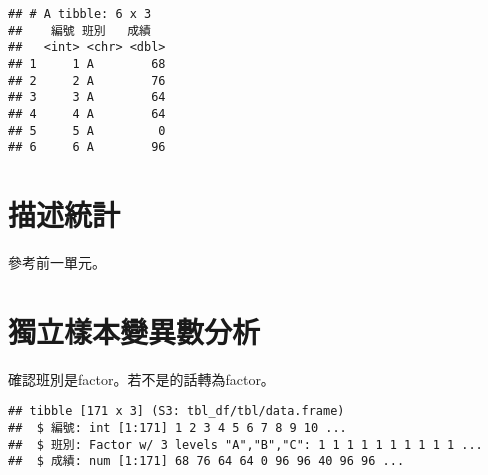 \documentclass[
]{book}
\newenvironment{Shaded}{\begin{snugshade}}{\end{snugshade}}
\newcommand{\DecValTok}[1]{\textcolor[rgb]{0.00,0.00,0.81}{#1}}
\newcommand{\FunctionTok}[1]{\textcolor[rgb]{0.00,0.00,0.00}{#1}}
\newcommand{\NormalTok}[1]{#1}
\newcommand{\OtherTok}[1]{\textcolor[rgb]{0.56,0.35,0.01}{#1}}
\newcommand{\SpecialCharTok}[1]{\textcolor[rgb]{0.00,0.00,0.00}{#1}}
\newcommand{\StringTok}[1]{\textcolor[rgb]{0.31,0.60,0.02}{#1}}
\begin{document}
\begin{Shaded}
\end{Shaded}

\begin{verbatim}
## # A tibble: 6 x 3
##    編號 班別   成績
##   <int> <chr> <dbl>
## 1     1 A        68
## 2     2 A        76
## 3     3 A        64
## 4     4 A        64
## 5     5 A         0
## 6     6 A        96
\end{verbatim}

\hypertarget{ux63cfux8ff0ux7d71ux8a08-2}{%
\section{描述統計}\label{ux63cfux8ff0ux7d71ux8a08-2}}

參考前一單元。

\hypertarget{ux7368ux7acbux6a23ux672cux8b8aux7570ux6578ux5206ux6790}{%
\section{獨立樣本變異數分析}\label{ux7368ux7acbux6a23ux672cux8b8aux7570ux6578ux5206ux6790}}

確認班別是factor。若不是的話轉為factor。

\begin{Shaded}
\end{Shaded}

\begin{verbatim}
## tibble [171 x 3] (S3: tbl_df/tbl/data.frame)
##  $ 編號: int [1:171] 1 2 3 4 5 6 7 8 9 10 ...
##  $ 班別: Factor w/ 3 levels "A","B","C": 1 1 1 1 1 1 1 1 1 1 ...
##  $ 成績: num [1:171] 68 76 64 64 0 96 96 40 96 96 ...
\end{verbatim}
\end{document}
